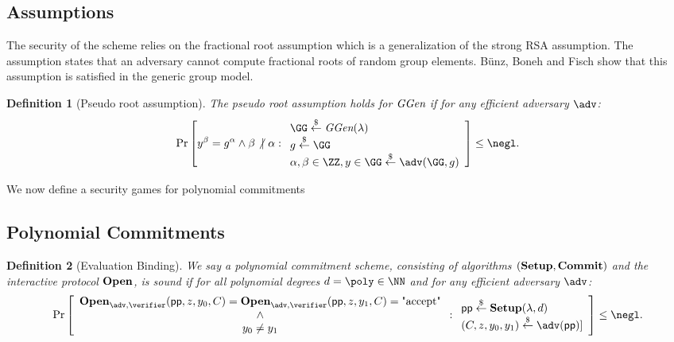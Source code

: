 \documentclass{article}
\newtheorem{definition}{Definition}
\begin{document}
\subsection{Assumptions}
The security of the scheme relies on the fractional root assumption which is a generalization of the strong RSA assumption. The assumption states that an adversary cannot compute fractional roots of random group elements. B\"unz, Boneh and Fisch \cite{journals/iacr/BonehBF18a} show that this assumption is satisfied in the generic group model.  
\begin{definition}[Pseudo root assumption]
The pseudo root assumption holds for $\textit{GGen}$ if for any efficient adversary $\adv$:
\[        
                \Pr\left[y^\beta = g^{\alpha} \wedge  \beta \not\vert~ \alpha   : 
                \begin{array}{l} 
                      \GG \sample \ggen(\lambda) \\ 
                      g \sample \GG \\
                      \alpha, \beta \in \ZZ,y\in \GG \sample \adv(\GG, g) 
                \end{array} 
        \right] \leq \negl.
\]
\end{definition}
We now define a security games for polynomial commitments

\subsection{Polynomial Commitments}
\begin{definition}[Evaluation Binding]
We say a polynomial commitment scheme, consisting of algorithms $(\textbf{{Setup}},\textbf{{Commit}})$ and the interactive protocol $\textbf{{Open}}$, is sound if for all polynomial degrees $d=\poly\in \NN$ and for any efficient adversary $\adv$:
	\[        
                \Pr\left[\begin{array}{c}\open_{\adv,\verifier}(\crs,z,y_0,C)=\open_{\adv,\verifier}(\crs,z,y_1,C)=\text{"accept"}\\
                \wedge\\
                y_0\neq y_1\end{array}  : 
                \begin{array}{l} 
                      \crs \sample \setup(\lambda, d) \\
                      (C,z,y_0,y_1)\sample \adv(\crs)]
                \end{array} 
        \right] \leq \negl.
\]
\end{definition}
\end{document}
